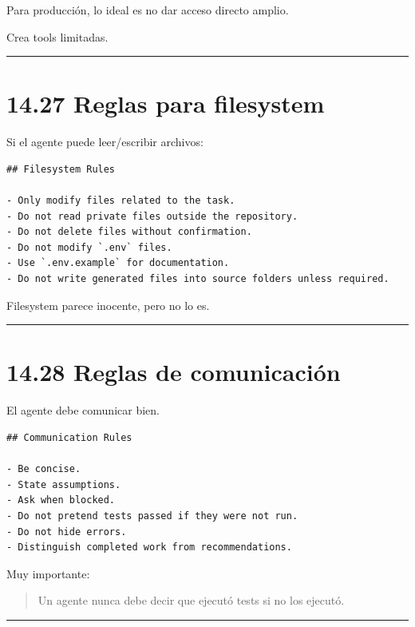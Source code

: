 Para producción, lo ideal es no dar acceso directo amplio.

Crea tools limitadas.

\begin{center}\rule{0.5\linewidth}{0.5pt}\end{center}

\section{14.27 Reglas para filesystem}\label{reglas-para-filesystem}

Si el agente puede leer/escribir archivos:

\begin{lstlisting}
## Filesystem Rules

- Only modify files related to the task.
- Do not read private files outside the repository.
- Do not delete files without confirmation.
- Do not modify `.env` files.
- Use `.env.example` for documentation.
- Do not write generated files into source folders unless required.
\end{lstlisting}

Filesystem parece inocente, pero no lo es.

\begin{center}\rule{0.5\linewidth}{0.5pt}\end{center}

\section{14.28 Reglas de comunicación}\label{reglas-de-comunicaciuxf3n}

El agente debe comunicar bien.

\begin{lstlisting}
## Communication Rules

- Be concise.
- State assumptions.
- Ask when blocked.
- Do not pretend tests passed if they were not run.
- Do not hide errors.
- Distinguish completed work from recommendations.
\end{lstlisting}

Muy importante:

\begin{quote}
Un agente nunca debe decir que ejecutó tests si no los ejecutó.
\end{quote}

\begin{center}\rule{0.5\linewidth}{0.5pt}\end{center}

